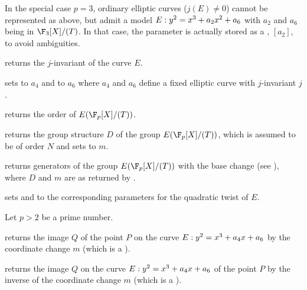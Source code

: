 In the special case $p = 3$, ordinary elliptic curves ($j(E)\neq 0$) cannot
be represented as above, but admit a model $E:y^2 = x^3+a_2\*x^2+a_6$ with
$a_2$ and $a_6$ being  in $\F_3[X]/(T)$. In that case, the parameter
 is actually stored as a , $[a_2]$, to avoid ambiguities.

returns the $j$-invariant of the curve $E$.

sets  to $a_4$ and  to $a_6$ where $a_4$ and $a_6$
define a fixed elliptic curve with $j$-invariant $j$.

returns the order of $E(\F_p[X]/(T))$.

returns the group structure $D$ of the group $E(\F_p[X]/(T))$,
which is assumed to be of order $N$ and sets  to $m$.

returns generators of the group $E(\F_p[X]/(T))$ with the base change 
(see ), where $D$ and $m$ are as returned by
.

sets  and  to the corresponding parameters for the
quadratic twist of $E$.


Let $p > 2$ be a prime number.

 returns
the image $Q$ of the point $P$ on the curve $E:y^2=x^3+a_4\*x+a_6$ by the
coordinate change $m$ (which is a ).

 returns
the image $Q$ on the curve $E:y^2=x^3+a_4\*x+a_6$ of the point $P$ by the
inverse of the coordinate change $m$ (which is a ).





